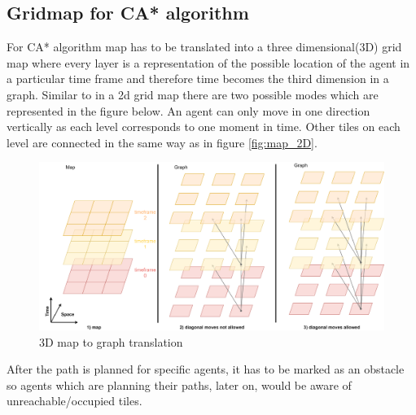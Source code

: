 \subsection{Gridmap for CA* algorithm}
For CA* algorithm map has to be translated into a three dimensional(3D) grid map where every layer is a representation of the possible location of the agent in a particular time frame and therefore time becomes the third dimension in a graph. Similar to in a 2d grid map there are two possible modes which are represented in the figure below. An agent can only move in one direction vertically as each level corresponds to one moment in time. Other tiles on each level are connected in the same way as in figure \ref{fig:map_2D}.
\begin{figure}[H]
    \centering
    \includegraphics[width=\textwidth]{pictures/map_3D.png}
    \caption{3D map to graph translation}
    \label{fig:map_3D}
\end{figure}
After the path is planned for specific agents, it has to be marked as an obstacle so agents which are planning their paths, later on, would be aware of unreachable/occupied tiles.

